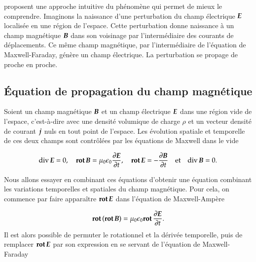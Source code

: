 \cite{Gie1985b} proposent une approche intuitive du phénomène
qui permet de mieux le comprendre. Imaginons la naissance d'une perturbation 
du champ électrique $\vece$ localisée en une région de l'espace. Cette perturbation
donne naissance à un champ magnétique $\vecb$ dans son voisinage par l'intermédiaire des 
courants de déplacements. Ce même champ magnétique, par l'intermédiaire de 
l'équation de Maxwell-Faraday, génère un champ électrique. La perturbation se 
propage de proche en proche.

\subsection{Équation de propagation du champ magnétique}
Soient un champ magnétique $\vecb$ et un champ électrique $\vece$ dans une région
vide de l'espace, c'est-à-dire avec une densité volumique de charge $\rho$ 
et un vecteur densité de courant $\vecj$ nuls en tout point de l'espace. 
Les évolution spatiale et temporelle de ces deux champs sont contrôlées par les équations
de Maxwell dans le vide

\begin{equation*}
\div \vece = 0,\quad \rot \vecb = \mu_0 \epsilon_0 \dd{\vece}{t},\quad
\rot \vece = -\dd{\vecb}{t} \quad \mathrm{et} \quad \div \vecb = 0.
\end{equation*}

Nous allons essayer en combinant ces équations d'obtenir une équation combinant
les variations temporelles et spatiales du champ magnétique. Pour cela, on 
commence par faire apparaître $\rot \vece$ dans l'équation de Maxwell-Ampère

\begin{equation*}
	\rot(\rot \vecb) = \mu_0 \epsilon_0 \rot \dd{\vece}{t}.
\end{equation*}
Il est alors possible de permuter le rotationnel et la dérivée temporelle, puis
de remplacer $\rot \vece$ par son expression en se servant de l'équation de 
Maxwell-Faraday

